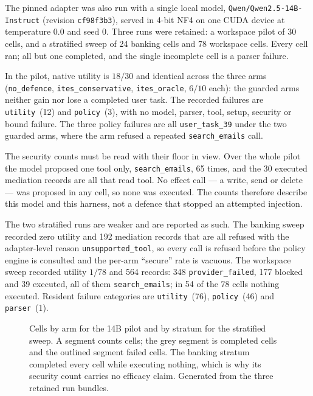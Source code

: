\documentclass[11pt]{article}
\begin{document}
The pinned adapter was also run with a single local model,
\texttt{Qwen/Qwen2.5-14B-Instruct} (revision \texttt{cf98f3b3}), served in
4-bit NF4 on one CUDA device at temperature $0.0$ and seed $0$. Three runs
were retained: a workspace pilot of 30 cells, and a stratified sweep of 24
banking cells and 78 workspace cells. Every cell ran; all but one completed,
and the single incomplete cell is a parser failure.

In the pilot, native utility is $18/30$ and identical across the three arms
(\texttt{no\_defence}, \texttt{ites\_conservative}, \texttt{ites\_oracle},
$6/10$ each): the guarded arms neither gain nor lose a completed user task.
The recorded failures are \texttt{utility}~(12) and \texttt{policy}~(3), with
no model, parser, tool, setup, security or bound failure. The three policy
failures are all \texttt{user\_task\_39} under the two guarded arms, where the
arm refused a repeated \texttt{search\_emails} call.

The security counts must be read with their floor in view. Over the whole
pilot the model proposed one tool only, \texttt{search\_emails}, 65 times, and
the 30 executed mediation records are all that read tool. No effect call --- a
write, send or delete --- was proposed in any cell, so none was executed. The
counts therefore describe this model and this harness, not a defence that
stopped an attempted injection.

The two stratified runs are weaker and are reported as such. The banking
sweep recorded zero utility and 192 mediation records that are all refused
with the adapter-level reason \texttt{unsupported\_tool}, so every call is
refused before the policy engine is consulted and the per-arm ``secure'' rate
is vacuous. The workspace sweep recorded utility $1/78$ and 564 records: 348
\texttt{provider\_failed}, 177 blocked and 39 executed, all of them
\texttt{search\_emails}; in 54 of the 78 cells nothing executed. Resident
failure categories are \texttt{utility}~(76), \texttt{policy}~(46) and
\texttt{parser}~(1).

\begin{figure}[t]
\centering

\caption{Cells by arm for the 14B pilot and by stratum for the stratified
sweep. A segment counts cells; the grey segment is completed cells and the
outlined segment failed cells. The banking stratum completed every cell while
executing nothing, which is why its security count carries no efficacy claim.
Generated from the three retained run bundles.}
\label{fig:runpod-cells}
\end{figure}
\end{document}
